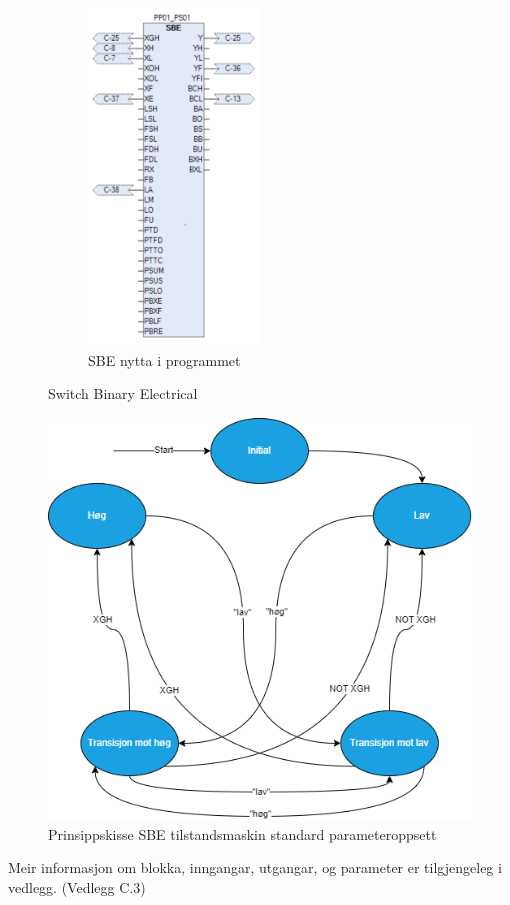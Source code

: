 \begin{figure}[htbp]
\begin{subfigure}[b]{0.46\textwidth}
        \includegraphics[width=0.5\textwidth]{Bilder/SBEBlokkIProgrammet.png}
        \caption{SBE nytta i programmet}\label{fig:Switch Binary Electrical blokk i programmet}
    \end{subfigure}
    \caption{Switch Binary Electrical}\label{fig:Switch Binary Electrical}
\end{figure} 
\begin{figure}[htbp]
    \centering
    \includegraphics[scale=0.45]{Figurar/SBE.drawio.png}
    \caption{Prinsippskisse SBE tilstandsmaskin standard parameteroppsett}\label{fig:SBE tilstandsmaskin}
\end{figure}
Meir informasjon om blokka, inngangar, utgangar, og parameter er tilgjengeleg i vedlegg. (Vedlegg C.3)
\newpage
